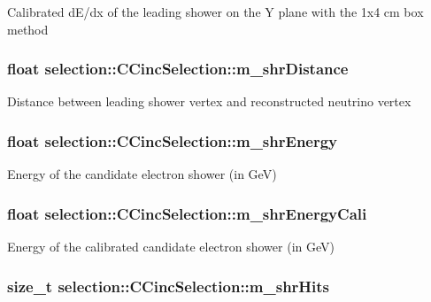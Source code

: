 Calibrated d\-E/dx of the leading shower on the Y plane with the 1x4 cm box method \hypertarget{classselection_1_1CCincSelection_ae496cb17c72b3ed96b13484a1ff9e3fb}{
\subsubsection[{m\-\_\-shr\-Distance}]{\setlength{\rightskip}{0pt plus 5cm}float selection\-::\-C\-Cinc\-Selection\-::m\-\_\-shr\-Distance\hspace{0.3cm}{\ttfamily [private]}}}\label{classselection_1_1CCincSelection_ae496cb17c72b3ed96b13484a1ff9e3fb}
Distance between leading shower vertex and reconstructed neutrino vertex \hypertarget{classselection_1_1CCincSelection_a2650ff351a7a6589c2b6ff9f701da321}{
\subsubsection[{m\-\_\-shr\-Energy}]{\setlength{\rightskip}{0pt plus 5cm}float selection\-::\-C\-Cinc\-Selection\-::m\-\_\-shr\-Energy\hspace{0.3cm}{\ttfamily [private]}}}\label{classselection_1_1CCincSelection_a2650ff351a7a6589c2b6ff9f701da321}
Energy of the candidate electron shower (in Ge\-V) \hypertarget{classselection_1_1CCincSelection_adec1b19741776f6e33a88b4d0f2b6330}{
\subsubsection[{m\-\_\-shr\-Energy\-Cali}]{\setlength{\rightskip}{0pt plus 5cm}float selection\-::\-C\-Cinc\-Selection\-::m\-\_\-shr\-Energy\-Cali\hspace{0.3cm}{\ttfamily [private]}}}\label{classselection_1_1CCincSelection_adec1b19741776f6e33a88b4d0f2b6330}
Energy of the calibrated candidate electron shower (in Ge\-V) \hypertarget{classselection_1_1CCincSelection_ade863b5fa6560fed9dada486fa3469d6}{
\subsubsection[{m\-\_\-shr\-Hits}]{\setlength{\rightskip}{0pt plus 5cm}size\-\_\-t selection\-::\-C\-Cinc\-Selection\-::m\-\_\-shr\-Hits\hspace{0.3cm}{\ttfamily [private]}}}\label{classselection_1_1CCincSelection_ade863b5fa6560fed9dada486fa3469d6}
